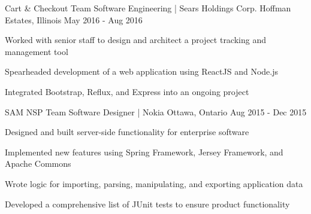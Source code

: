 \begin{cventries}
\cventry
    {Cart \& Checkout Team}
    {Software Engineering | Sears Holdings Corp.}
    {Hoffman Estates, Illinois}
    {May 2016 - Aug 2016}
    {
      \begin{cvitems}
        \item {Worked with senior staff to design and architect a project tracking and management tool}
        \item {Spearheaded development of a web application using ReactJS and Node.js}
        \item {Integrated Bootstrap, Reflux, and Express into an ongoing project}
      \end{cvitems}
    }

\cventry
    {SAM NSP Team}
    {Software Designer | Nokia}
    {Ottawa, Ontario}
    {Aug 2015 - Dec 2015}
    {
      \begin{cvitems}
        \item {Designed and built server-side functionality for enterprise software}
        \item {Implemented new features using Spring Framework, Jersey Framework, and Apache Commons}
        \item {Wrote logic for importing, parsing, manipulating, and exporting application data}
        \item {Developed a comprehensive list of JUnit tests to ensure product functionality}
      \end{cvitems}
    }

\end{cventries}
